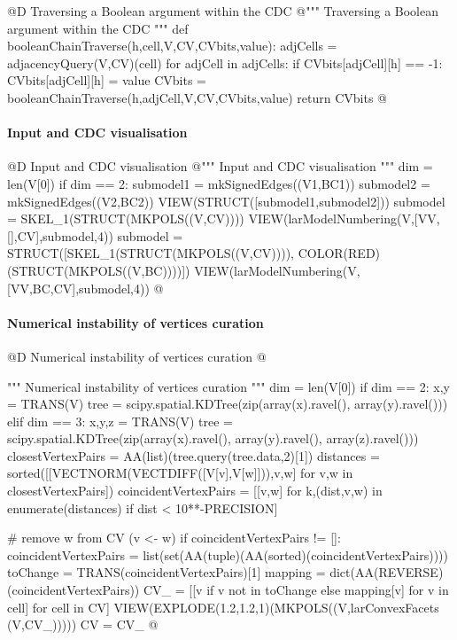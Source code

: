 \documentclass[11pt,oneside]{article}	%
\begin{document}
@D Traversing a Boolean argument within the CDC
@{""" Traversing a Boolean argument within the CDC """
def booleanChainTraverse(h,cell,V,CV,CVbits,value):
	adjCells = adjacencyQuery(V,CV)(cell)
	for adjCell in adjCells: 
		if CVbits[adjCell][h] == -1:
			CVbits[adjCell][h] = value
			CVbits = booleanChainTraverse(h,adjCell,V,CV,CVbits,value)
	return CVbits
@}


\paragraph{Input and CDC visualisation}

@D Input and CDC visualisation
@{""" Input and CDC visualisation """
dim = len(V[0])
if dim == 2:
    submodel1 = mkSignedEdges((V1,BC1))
    submodel2 = mkSignedEdges((V2,BC2))
    VIEW(STRUCT([submodel1,submodel2]))
submodel = SKEL_1(STRUCT(MKPOLS((V,CV))))
VIEW(larModelNumbering(V,[VV,[],CV],submodel,4))
submodel = STRUCT([SKEL_1(STRUCT(MKPOLS((V,CV)))), COLOR(RED)(STRUCT(MKPOLS((V,BC))))])
VIEW(larModelNumbering(V,[VV,BC,CV],submodel,4))
@}

\paragraph{Numerical instability of vertices curation}

@D Numerical instability of vertices curation
@{""" Numerical instability of vertices curation """
dim = len(V[0])
if dim == 2:
    x,y = TRANS(V)
    tree = scipy.spatial.KDTree(zip(array(x).ravel(), array(y).ravel()))
elif dim == 3:
    x,y,z = TRANS(V)
    tree = scipy.spatial.KDTree(zip(array(x).ravel(), array(y).ravel(), array(z).ravel()))
closestVertexPairs = AA(list)(tree.query(tree.data,2)[1])
distances = sorted([[VECTNORM(VECTDIFF([V[v],V[w]])),v,w] for v,w in closestVertexPairs])
coincidentVertexPairs = [[v,w] for k,(dist,v,w) in enumerate(distances) if dist < 10**-PRECISION]

# remove w from CV (v <- w)
if coincidentVertexPairs != []:
	coincidentVertexPairs = list(set(AA(tuple)(AA(sorted)(coincidentVertexPairs))))
	toChange = TRANS(coincidentVertexPairs)[1]
	mapping = dict(AA(REVERSE)(coincidentVertexPairs))
	CV_ = [[v  if v not in toChange else mapping[v] for v in cell] for cell in CV]
	VIEW(EXPLODE(1.2,1.2,1)(MKPOLS((V,larConvexFacets (V,CV_)))))
	CV = CV_
@}
\end{document}
